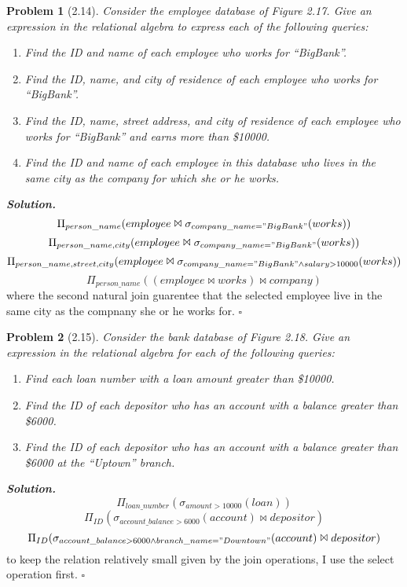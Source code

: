\documentclass[12pt]{article}
\newtheorem{problem}{Problem}
\newenvironment{solution}[1][\it{Solution}]{\textbf{#1. } }{$\square$}
\begin{document}
\begin{problem}[2.14]
    Consider the employee database of Figure 2.17. Give an expression in the relational algebra to express each of the following queries:
    \begin{enumerate}
        \item Find the ID and name of each employee who works for “BigBank”.
        \item Find the ID, name, and city of residence of each employee who works for “BigBank”.
        \item Find the ID, name, street address, and city of residence of each employee who works for “BigBank” and earns more than \$10000.
        \item Find the ID and name of each employee in this database who lives in the same city as the company for which she or he works.
    \end{enumerate}
\end{problem}
\begin{solution}
    \[\Pi_{person\_name}(employee\Join\sigma_{company\_name="BigBank"}(works))\]
    \[\Pi_{person\_name,city}(employee\Join\sigma_{company\_name="BigBank"}(works))\]
    \[\Pi_{person\_name,street,city}(employee\Join\sigma_{company\_name="BigBank"\land salary>10000}(works))\]
    \[\Pi_{person\_name}((employee\Join works)\Join company)\]
    where the second natural join guarentee that the selected employee live in the same city as the compnany she or he works for.
\end{solution}
\begin{problem}[2.15]
    Consider the bank database of Figure 2.18. Give an expression in the relational algebra for each of the following queries:
    \begin{enumerate}
        \item Find each loan number with a loan amount greater than \$10000.
        \item Find the ID of each depositor who has an account with a balance greater than \$6000.
        \item Find the ID of each depositor who has an account with a balance greater than \$6000 at the “Uptown” branch.
    \end{enumerate}
\end{problem}
\begin{solution}
    \[\Pi_{loan\_number}(\sigma_{amount>10000}(loan))\]
    \[\Pi_{ID}(\sigma_{account\_balance>6000}(account)\Join depositor)\]
    \[\Pi_{ID}(\sigma_{account\_balance>6000\land branch\_name="Downtown"}(account)\Join depositor)\]
    to keep the relation relatively small given by the join operations, I use the select operation first.
\end{solution}
 
\end{document}
